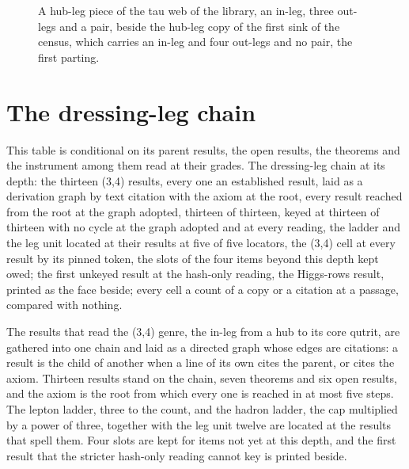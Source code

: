 \begin{chproof}
\begin{figure}[h]
\caption{A hub-leg piece of the tau web of the library, an in-leg, three out-legs and a pair, beside the hub-leg copy of the first sink of the census, which carries an in-leg and four out-legs and no pair, the first parting.}\end{figure}
\end{chproof}
\section{The dressing-leg chain}\label{mod:VIII-1-D540427-the-dressing-leg-chain}
\begin{chtable}\label{box:VIII-1-D540427-the-dressing-leg-chain:1}
This table is conditional on its parent results, the open results, the theorems and the instrument among them read at their grades. The dressing-leg chain at its depth: the thirteen (3,4) results, every one an established result, laid as a derivation graph by text citation with the axiom at the root, every result reached from the root at the graph adopted, thirteen of thirteen, keyed at thirteen of thirteen with no cycle at the graph adopted and at every reading, the ladder and the leg unit located at their results at five of five locators, the (3,4) cell at every result by its pinned token, the slots of the four items beyond this depth kept owed; the first unkeyed result at the hash-only reading, the Higgs-rows result, printed as the face beside; every cell a count of a copy or a citation at a passage, compared with nothing.
\end{chtable}
The results that read the (3,4) genre, the in-leg from a hub to its core qutrit, are gathered into one chain and laid as a directed graph whose edges are citations: a result is the child of another when a line of its own cites the parent, or cites the axiom. Thirteen results stand on the chain, seven theorems and six open results, and the axiom is the root from which every one is reached in at most five steps. The lepton ladder, three to the count, and the hadron ladder, the cap multiplied by a power of three, together with the leg unit twelve are located at the results that spell them. Four slots are kept for items not yet at this depth, and the first result that the stricter hash-only reading cannot key is printed beside.
